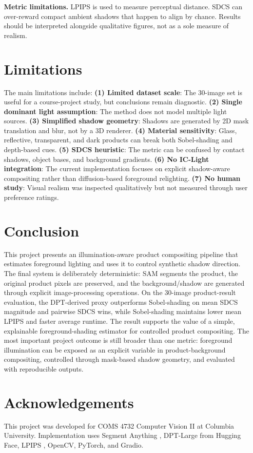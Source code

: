 \documentclass{article}
\begin{document}
\textbf{Metric limitations.} LPIPS \citep{zhang2018lpips} is used to measure perceptual distance. SDCS can over-reward compact ambient shadows that happen to align by chance. Results should be interpreted alongside qualitative figures, not as a sole measure of realism.

\section{Limitations}
The main limitations include: \textbf{(1) Limited dataset scale}: The 30-image set is useful for a course-project study, but conclusions remain diagnostic. \textbf{(2) Single dominant light assumption}: The method does not model multiple light sources. \textbf{(3) Simplified shadow geometry}: Shadows are generated by 2D mask translation and blur, not by a 3D renderer. \textbf{(4) Material sensitivity}: Glass, reflective, transparent, and dark products can break both Sobel-shading and depth-based cues. \textbf{(5) SDCS heuristic}: The metric can be confused by contact shadows, object bases, and background gradients. \textbf{(6) No IC-Light integration}: The current implementation focuses on explicit shadow-aware compositing rather than diffusion-based foreground relighting. \textbf{(7) No human study}: Visual realism was inspected qualitatively but not measured through user preference ratings.

\section{Conclusion}
This project presents an illumination-aware product compositing pipeline that estimates foreground lighting and uses it to control synthetic shadow direction. The final system is deliberately deterministic: SAM segments the product, the original product pixels are preserved, and the background/shadow are generated through explicit image-processing operations. On the 30-image product-result evaluation, the DPT-derived proxy outperforms Sobel-shading on mean SDCS magnitude and pairwise SDCS wins, while Sobel-shading maintains lower mean LPIPS and faster average runtime. The result supports the value of a simple, explainable foreground-shading estimator for controlled product compositing. The most important project outcome is still broader than one metric: foreground illumination can be exposed as an explicit variable in product-background compositing, controlled through mask-based shadow geometry, and evaluated with reproducible outputs.

\section*{Acknowledgements}
This project was developed for COMS 4732 Computer Vision II at Columbia University. Implementation uses Segment Anything \citep{kirillov2023sam}, DPT-Large \citep{ranftl2021dpt} from Hugging Face, LPIPS \citep{zhang2018lpips}, OpenCV, PyTorch, and Gradio.



\end{document}
